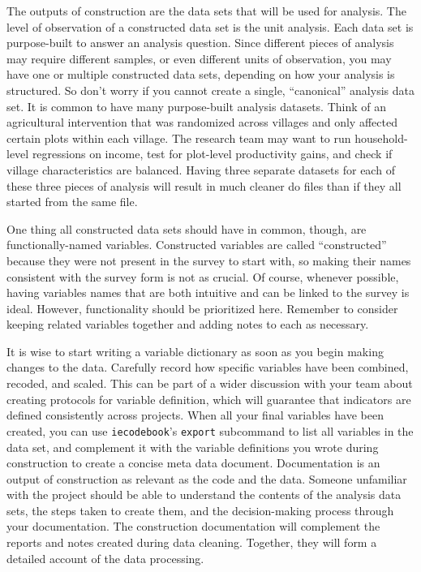 The outputs of construction are the data sets that will be used for analysis.
The level of observation of a constructed data set is the unit analysis. 
Each data set is purpose-built to answer an analysis question.
Since different pieces of analysis may require different samples,
or even different units of observation,
you may have one or multiple constructed data sets, 
depending on how your analysis is structured.
So don't worry if you cannot create a single, ``canonical'' analysis data set.
It is common to have many purpose-built analysis datasets.
Think of an agricultural intervention that was randomized across villages and only affected certain plots within each village. 
The research team may want to run household-level regressions on income, test for plot-level productivity gains, and check if village characteristics are balanced.
Having three separate datasets for each of these three pieces of analysis will result in much cleaner do files than if they all started from the same file. 
 
One thing all constructed data sets should have in common, though, are functionally-named variables.
Constructed variables are called ``constructed'' because they were not present in the survey to start with,
so making their names consistent with the survey form is not as crucial.
Of course, whenever possible, having variables names that are both intuitive and can be linked to the survey is ideal.
However, functionality should be prioritized here.
Remember to consider keeping related variables together and adding notes to each as necessary.

It is wise to start writing a variable dictionary as soon as you begin making changes to the data.
Carefully record how specific variables have been combined, recoded, and scaled. 
This can be part of a wider discussion with your team about creating protocols for variable definition, which will guarantee that indicators are defined consistently across projects.
When all your final variables have been created, you can use \texttt{iecodebook}'s \texttt{export} subcommand to list all variables in the data set, 
and complement it with the variable definitions you wrote during construction to create a concise meta data document.
Documentation is an output of construction as relevant as the code and the data.
Someone unfamiliar with the project should be able to understand the contents of the analysis data sets, the steps taken to create them, and the decision-making process through your documentation.
The construction documentation will complement the reports and notes created during data cleaning.
Together, they will form a detailed account of the data processing.



